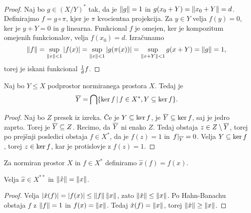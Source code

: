 \begin{proof}
  Naj bo $g \in (X/Y)^*$ tak, da je $\left\lVert g\right\rVert = 1$ in $g(x_0 + Y) = \left\lVert x_0 +
	Y\right\rVert = d$.
  Definirajmo $f = g \circ \pi$, kjer je $\pi$ kvocientna projekcija.
  Za $y \in Y$ velja $f(y) = 0$, ker je $y + Y = 0$ in $g$ linearna.
  Funkcional $f$ je omejen, ker je kompozitum omejenih funkcionalov, velja
  $f(x_0) = d$.
  Izračunamo
  \[
	\left\lVert f\right\rVert = \sup_{\left\lVert x\right\rVert < 1} \left| f(x) \right|
	= \sup_{\left\lVert x\right\rVert < 1} \left| g(\pi(x)) \right|
	= \sup_{\left\lVert x + Y\right\rVert < 1} g(x + Y)
	= \left\lVert g\right\rVert = 1,
  \]
  torej je iskani funkcional $\frac{1}{d} f$.
\end{proof}


\begin{izrek}
  Naj bo $Y \le X$ podprostor normiranega prostora $X$.
  Tedaj je
  \[
	\overline{Y} = \bigcap \{ \operatorname{ker} f \,|\, f \in X^*, Y \subseteq \operatorname{ker} f \}.
  \]
\end{izrek}

\begin{proof}
  Naj bo $Z$ presek iz izreka.
  Če je $Y \subseteq \operatorname{ker} f$, je $\overline{Y} \subseteq \operatorname{ker} f$, saj je jedro
  zaprto.
  Torej je $\overline{Y} \subseteq Z$.
  Recimo, da $\overline{Y}$ ni enako $Z$.
  Tedaj obstaja $z \in Z \setminus \overline{Y}$, torej po prejšnji posledici obstaja
  $f \in X^*$, da je $f(z) = 1$ in $\left. f \right|_{\overline{Y}} = 0$.
  Velja $Y \subseteq \operatorname{ker} f$, torej $z \in \operatorname{ker} f$, kar je protislovje z
  $f(z) = 1$.
\end{proof}



\begin{definicija}
  Za normiran prostor $X$ in $f \in X^*$ definiramo $\hat{x}(f) = f(x)$.
\end{definicija}

\begin{trditev}
  Velja $\hat{x} \in X^{**}$ in $\left\lVert\hat{x}\right\rVert = \left\lVert x\right\rVert$.
\end{trditev}

\begin{proof}
  Velja $\left| \hat{x}(f) \right| = \left| f(x) \right| \le \left\lVert f\right\rVert \left\lVert x\right\rVert$, zato
  $\left\lVert\hat{x}\right\rVert \le \left\lVert x\right\rVert$.
  Po Hahn-Banachu obstaja $f$ z $\left\lVert f\right\rVert = 1$ in $f(x) = \left\lVert x\right\rVert$.
  Tedaj $\hat{x}(f) = \left\lVert x\right\rVert$, torej $\left\lVert\hat{x}\right\rVert \ge \left\lVert x\right\rVert$.
\end{proof}

